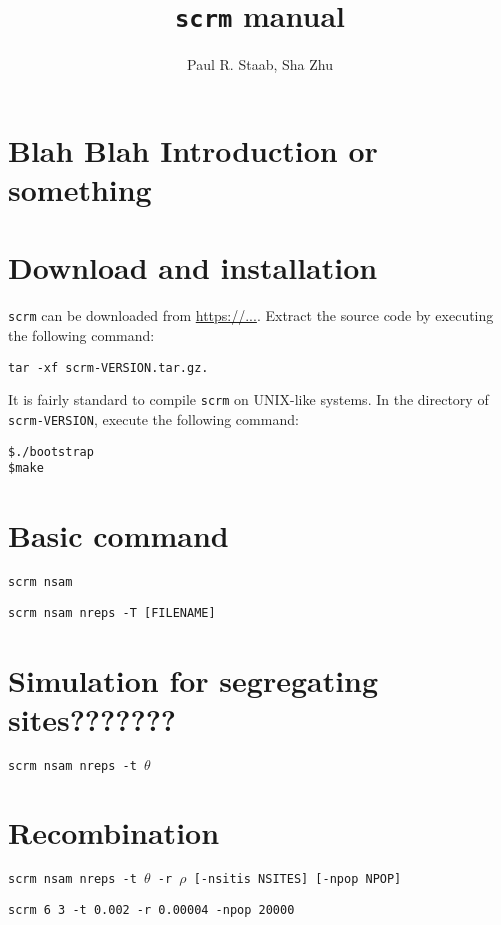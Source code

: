 \documentclass[12pt]{article}
\title{{\tt scrm} manual}
\author{Paul R. Staab, Sha Zhu}
\date{}
\newcommand{\cm}[1]{\begin{center}{\tt #1}\end{center}}
\begin{document}
\maketitle

\section{Blah Blah Introduction or something}

\section{Download and installation}
{\tt scrm} can be downloaded from \url{https://...}. Extract the source code by executing the following command:
\cm{tar -xf scrm-VERSION.tar.gz.}

It is fairly standard to compile {\tt scrm} on UNIX-like systems. In the directory of {\tt scrm-VERSION}, execute the following command:
\begin{verbatim}
$./bootstrap
$make
\end{verbatim}

\section{Basic command}
\cm{scrm nsam }


\cm{scrm nsam nreps -T [FILENAME]}


\section{Simulation for segregating sites???????}
\cm{scrm nsam nreps -t $\theta$}



\section{Recombination}


\cm{scrm nsam nreps -t $\theta$ -r $\rho$ [-nsitis NSITES] [-npop NPOP] }

\cm{scrm 6 3 -t 0.002 -r 0.00004 -npop 20000 }
\end{document}
